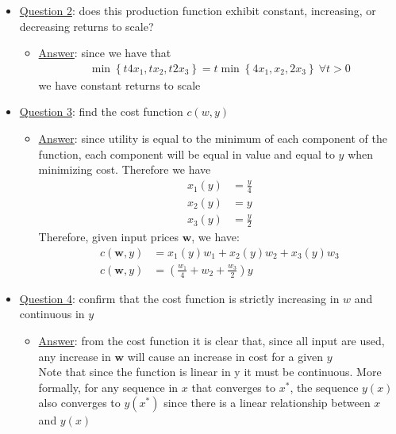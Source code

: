 \documentclass{article}
\begin{document}
  \begin{itemize}
    \item  \underline{Question 2}: does this production function exhibit constant, increasing, or decreasing returns to scale?
    \begin{itemize}
      \item  \underline{Answer}: since we have that
      \begin{gather*}
        \min \left\{ t4x_{1}, tx_{2}, t2x_{3} \right\} = t \min \left\{ 4x_{1}, x_{2}, 2x_{3} \right\} \ \forall t >0
      \end{gather*}
      we have constant returns to scale
    \end{itemize}
  \end{itemize}
  \begin{itemize}
    \item  \underline{Question 3}: find the cost function $c(w,y)$
    \begin{itemize}
      \item  \underline{Answer}: since utility is equal to the minimum of each component of the function, each component will be equal in value and equal to $y$ when minimizing cost. Therefore we have
      \begin{align*}
        x_{1}(y) &= \frac{y}{4} \\
        x_{2}(y) &= y \\
        x_{3}(y) &= \frac{y}{2}
      \end{align*}
      Therefore, given input prices $\mathbf{w}$, we have:
      \begin{align*}
        c(\mathbf{w},y) &= x_{1}(y) w_{1} + x_{2}(y)w_{2} + x_{3}(y)w_{3} \\
        c(\mathbf{w},y) &= (\frac{w_{1}}{4} + w_{2} + \frac{w_{3}}{2})y
      \end{align*}
    \end{itemize}
  \end{itemize}
  \begin{itemize}
    \item  \underline{Question 4}: confirm that the cost function is strictly increasing in $w$ and continuous in $y$
    \begin{itemize}
      \item  \underline{Answer}: from the cost function it is clear that, since all input are used, any increase in $\mathbf{w}$ will cause an increase in cost for a given $y$ \\ Note that since the function is linear in y it must be continuous. More formally, for any sequence in $x$ that converges to $x^{*}$, the sequence $y(x)$ also converges to $y(x^{*})$ since there is a linear relationship between $x$ and $y(x)$
    \end{itemize}
  \end{itemize}
\par
\end{document}
